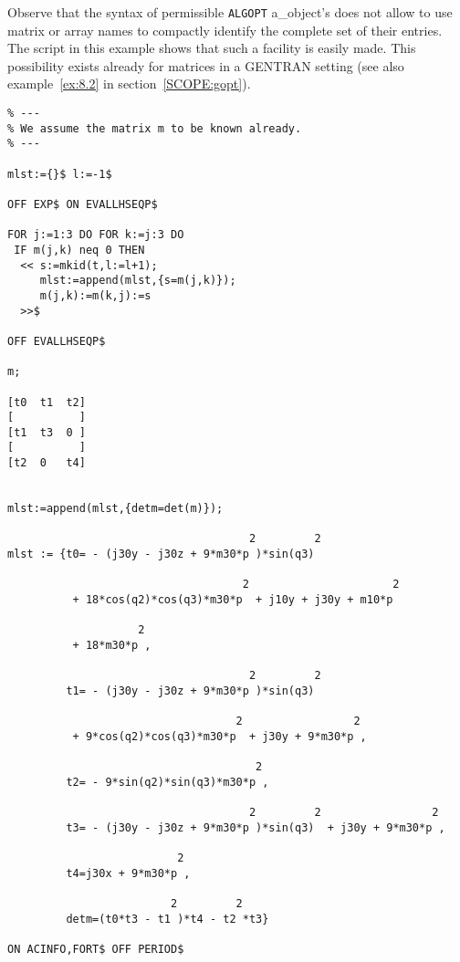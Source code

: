 Observe that the syntax of permissible {\tt ALGOPT} a\_object's does not 
allow to use matrix or array names  to compactly identify the complete set
of their entries. The script in this example shows that such a facility is
easily made. This possibility exists already for matrices in a GENTRAN 
setting (see also example~\ref{ex:8.2} in section~\ref{SCOPE:gopt}).
{\small
\begin{verbatim}
% ---
% We assume the matrix m to be known already.
% ---

mlst:={}$ l:=-1$

OFF EXP$ ON EVALLHSEQP$

FOR j:=1:3 DO FOR k:=j:3 DO
 IF m(j,k) neq 0 THEN
  << s:=mkid(t,l:=l+1);
     mlst:=append(mlst,{s=m(j,k)});
     m(j,k):=m(k,j):=s
  >>$

OFF EVALLHSEQP$

m;

[t0  t1  t2]
[          ]
[t1  t3  0 ]
[          ]
[t2  0   t4]


mlst:=append(mlst,{detm=det(m)});

                                     2         2
mlst := {t0= - (j30y - j30z + 9*m30*p )*sin(q3)

                                    2                      2
          + 18*cos(q2)*cos(q3)*m30*p  + j10y + j30y + m10*p

                    2
          + 18*m30*p ,

                                     2         2
         t1= - (j30y - j30z + 9*m30*p )*sin(q3)

                                   2                 2
          + 9*cos(q2)*cos(q3)*m30*p  + j30y + 9*m30*p ,

                                      2
         t2= - 9*sin(q2)*sin(q3)*m30*p ,

                                     2         2                 2
         t3= - (j30y - j30z + 9*m30*p )*sin(q3)  + j30y + 9*m30*p ,

                          2
         t4=j30x + 9*m30*p ,

                         2         2
         detm=(t0*t3 - t1 )*t4 - t2 *t3}

ON ACINFO,FORT$ OFF PERIOD$
\end{verbatim}}
